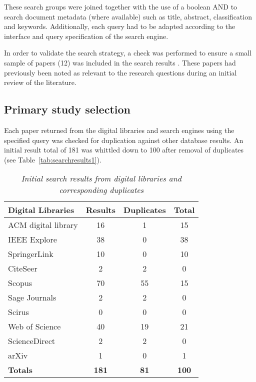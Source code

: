 These search groups were joined together with the use of a boolean AND to search document metadata (where available) such as title, abstract, classification and keywords. Additionally, each query had to be adapted according to the interface and query specification of the search engine.

In order to validate the search strategy, a check was performed to ensure a small sample of papers (12) was included in the search results \citep[][]{bateman08, hearst08, kaser07, lohmann09, oosterman10, rivadeneira07, schrammel09, schrammel09b, seifert08, kuo07, halvey07, sinclair08}. These papers had previously been noted as relevant to the research questions during an initial review of the literature.

\subsection{Primary study selection}
Each paper returned from the digital libraries and search engines using the specified query was checked for duplication against other database results. An initial result total of 181 was whittled down to 100 after removal of duplicates (see Table~\vref{tab:searchresults1}).

\begin{table}
\centering
\caption{\textit{Initial search results from digital libraries and corresponding duplicates}}
\begin{tabular}{|l|c|c|c|} \hline
\textbf{Digital Libraries}&\textbf{Results}&\textbf{Duplicates}&\textbf{Total}\\ \hline
ACM digital library&16&1&15\\ \hline
IEEE Explore&38&0&38\\ \hline
SpringerLink&10&0&10\\ \hline
CiteSeer&2&2&0\\ \hline
Scopus&70&55&15\\ \hline
Sage Journals&2&2&0\\ \hline
Scirus&0	&0&0\\ \hline
Web of Science&40&19&21\\ \hline
ScienceDirect&2&2&0\\ \hline
arXiv&1&0&1\\ \hline
\textbf{Totals}&\textbf{181}&\textbf{81}&\textbf{100}\\
\hline\end{tabular}
\label{tab:searchresults1}
\end{table}

